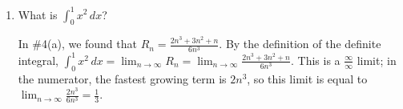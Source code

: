 \documentclass[main]{subfiles}
\begin{document}
\begin{enumerate}[resume]
\begin{enumerate}
\begin{solution}
\begin{align*}
        \right)^2 \frac{1}{n} + \left( \frac{3}{n} \right)^2 \frac{1}{n} +
        \cdots + \left( \frac{n}{n} \right)^2 \frac{1}{n} \\
        &= \frac{1}{n^3} + \frac{2^2}{n^3} + \frac{3^2}{n^3} + \cdots +
        \frac{n^2}{n^3} \\
        &= \frac{1}{n^3} \left( 1 + 2^2 + 3^2 + \cdots + n^2 \right) \\
        \intertext{Using the useful fact given in the problem, this is
          equal to}
        &= \frac{1}{n^3} \cdot \frac{2n^3 + 3n^2 + n}{6} \\
        &= \boxed{\frac{2n^3 + 3n^2 + n}{6n^3}}        
      \end{align*}
    \end{solution}





  \item    
    \begin{problem}[36pt]
      What is $\displaystyle \int_0^1 x^2\,dx$?
    \end{problem}

    \begin{solution}
      In {{{{\#4}}(a)}}, we found that
      $\displaystyle R_n = \frac{2n^3 + 3n^2 + n}{6n^3}$.  By the
      definition of the definite integral, $\displaystyle \int_0^1 x^2\,dx
      = \lim_{n \to \infty} R_n = \lim_{n \to \infty} \frac{2n^3 + 3n^2 +
        n}{6n^3}$.  This is a $\frac{\infty}{\infty}$ limit; in the
      numerator, the fastest growing term is $2n^3$, so this limit is
      equal to $\displaystyle \lim_{n \to \infty} \frac{2n^3}{6n^3} =
      \boxed{\frac{1}{3}}$.
    \end{solution}


\end{enumerate}
\end{enumerate}
\end{document}
